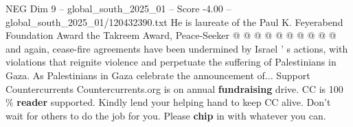 \begin{textsample}{NEG Dim 9 – global\_south\_2025\_01 – Score -4.00 – global\_south\_2025\_01/120432390.txt}
He is laureate of the Paul K.
Feyerabend Foundation Award the Takreem Award, Peace-Seeker @ @ @ @ @ @ @ @ @ @ and again, cease-fire agreements have been undermined by Israel ' s actions, with violations that reignite violence and perpetuate the suffering of Palestinians in Gaza.
As Palestinians in Gaza celebrate the announcement of...
Support Countercurrents Countercurrents.org is on annual \textbf{fundraising} drive.
CC is 100 \% \textbf{reader} supported.
Kindly lend your helping hand to keep CC alive.
Don't wait for others to do the job for you.
Please \textbf{chip} in with whatever you can.

\end{textsample}
